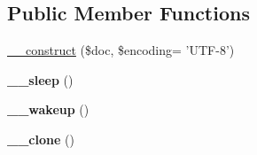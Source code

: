 \subsection*{Public Member Functions}
\begin{DoxyCompactItemize}
\item 
\hyperlink{classDom_1_1Template_a0d2b30123f7f747c15d966ef665f44c6}{\+\_\+\+\_\+construct} (\$doc, \$encoding= 'U\+T\+F-\/8')
\item 
\hypertarget{classDom_1_1Template_afba6573b14e0ffda52ceb994633b601f}{{\bfseries \+\_\+\+\_\+sleep} ()}\label{classDom_1_1Template_afba6573b14e0ffda52ceb994633b601f}

\item 
\hypertarget{classDom_1_1Template_a6babd57193c0dc8c5d779a17e18c49b4}{{\bfseries \+\_\+\+\_\+wakeup} ()}\label{classDom_1_1Template_a6babd57193c0dc8c5d779a17e18c49b4}

\item 
\hypertarget{classDom_1_1Template_a5c3de20ca635f4190e5650efcaad3b9c}{{\bfseries \+\_\+\+\_\+clone} ()}\label{classDom_1_1Template_a5c3de20ca635f4190e5650efcaad3b9c}


\end{DoxyCompactItemize}
